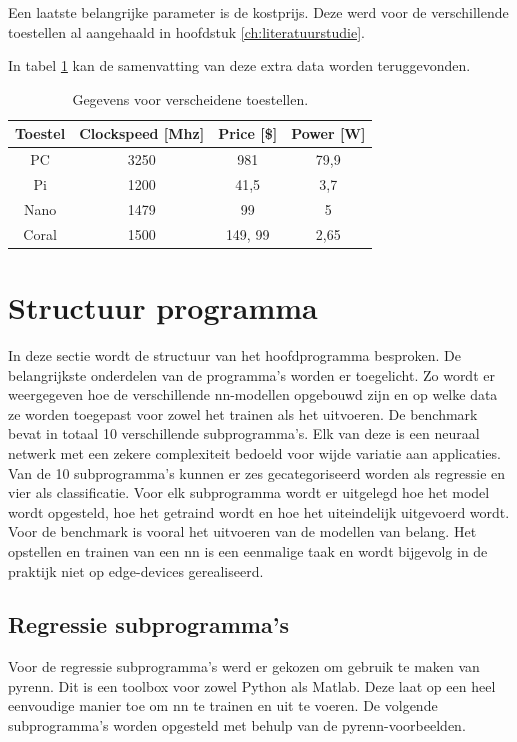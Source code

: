 Een laatste belangrijke parameter is de kostprijs. Deze werd voor de verschillende toestellen al aangehaald in hoofdstuk \ref{ch:literatuurstudie}.
	
In tabel \ref{tab:datadevices} kan de samenvatting van deze extra data worden teruggevonden. 
	
	\begin{table}[]
		\centering
		\begin{tabular}{cccc}
			\hline
			Toestel                    & Clockspeed {[}Mhz{]} & Price {[}\${]} & Power {[}W{]} \\ \hline
			\multicolumn{1}{c|}{PC}    & 3250                 & 981            & 79,9          \\
			\multicolumn{1}{c|}{Pi}    & 1200                 & 41,5           & 3,7           \\
			\multicolumn{1}{c|}{Nano}  & 1479                 & 99             & 5             \\
			\multicolumn{1}{c|}{Coral} & 1500                 & 149, 99        & 2,65          \\ \hline
		\end{tabular}
		\caption{Gegevens voor verscheidene toestellen.}
		\label{tab:datadevices}
	\end{table}


\newpage

\section{Structuur programma} 
In deze sectie wordt de structuur van het hoofdprogramma besproken. De belangrijkste onderdelen van de programma's worden er toegelicht. Zo wordt er weergegeven hoe de verschillende \gls{nn}-modellen opgebouwd zijn en op welke data ze worden toegepast voor zowel het trainen als het uitvoeren. De benchmark bevat in totaal 10 verschillende subprogramma's. Elk van deze is een neuraal netwerk met een zekere complexiteit bedoeld voor wijde variatie aan applicaties. Van de 10 subprogramma's kunnen er zes gecategoriseerd worden als regressie en vier als classificatie. Voor elk subprogramma wordt er uitgelegd hoe het model wordt opgesteld, hoe het getraind wordt en hoe het uiteindelijk uitgevoerd wordt. Voor de benchmark is vooral het uitvoeren van de modellen van belang. Het opstellen en trainen van een \gls{nn} is een eenmalige taak en wordt bijgevolg in de praktijk niet op edge-devices gerealiseerd.


	\subsection{Regressie subprogramma's} \label{subsec:regrsubprog}
	Voor de regressie subprogramma's werd er gekozen om gebruik te maken van pyrenn. Dit is een toolbox voor zowel Python als Matlab. Deze laat op een heel eenvoudige manier toe om \gls{nn} te trainen en uit te voeren. De volgende subprogramma's worden opgesteld met behulp van de pyrenn-voorbeelden. 
	
